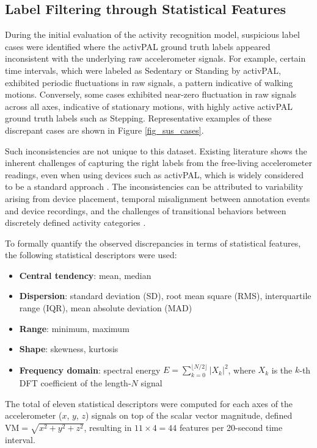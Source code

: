 \subsection{Label Filtering through Statistical Features}
\label{sec_label_filtering}
During the initial evaluation of the activity recognition model, suspicious label cases were identified where the activPAL ground truth labels appeared inconsistent with the underlying raw accelerometer signals. For example, certain time intervals, which were labeled as Sedentary or Standing by activPAL, exhibited periodic fluctuations in raw signals, a pattern indicative of walking motions. Conversely, some cases exhibited near-zero fluctuation in raw signals across all axes, indicative of stationary motions, with highly active activPAL ground truth labels such as Stepping. Representative examples of these discrepant cases are shown in Figure \ref{fig_sus_cases}.


Such inconsistencies are not unique to this dataset. Existing literature shows the inherent challenges of capturing the right labels from the free-living accelerometer readings, even when using devices such as activPAL, which is widely considered to be a standard approach \cite{}. The inconsistencies can be attributed to variability arising from device placement, temporal misalignment between annotation events and device recordings, and the challenges of transitional behaviors between discretely defined activity categories \cite{}.


To formally quantify the observed discrepancies in terms of statistical features, the following statistical descriptors were used:

\begin{itemize}
    \item \textbf{Central tendency}: mean, median
    \item \textbf{Dispersion}: standard deviation (SD), root mean square (RMS), interquartile range (IQR), mean absolute deviation (MAD)
    \item \textbf{Range}: minimum, maximum
    \item \textbf{Shape}: skewness, kurtosis
    \item \textbf{Frequency domain}: spectral energy $E = \sum_{k=0}^{\lfloor N/2 \rfloor} |X_k|^2$, where $X_k$ is the $k$-th DFT coefficient of the length-$N$ signal~\cite{oppenheim1999discrete}
\end{itemize}


The total of eleven statistical descriptors were computed for each axes of the accelerometer ($x$, $y$, $z$) signals on top of the scalar vector magnitude, defined $\mathrm{VM} = \sqrt{x^2 + y^2 + z^2}$, resulting in $11 \times 4 = 44$ features per 20-second time interval.


